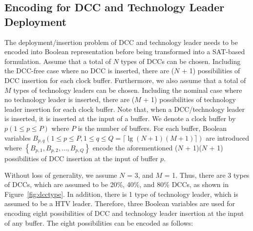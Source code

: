 \subsection{Encoding for DCC and Technology Leader Deployment}
\label{subsec:eddcd}
The deployment/insertion problem of DCC and technology leader needs to be encoded into Boolean representation before being transformed into a SAT-based formulation. Assume that a total of $N$ types of DCCs can be chosen. Including the DCC-free case where no DCC is inserted, there are ($N$ + 1) possibilities of DCC insertion for each clock buffer. Furthermore, we also assume that a total of $M$ types of technology leaders can be chosen. Including the nominal case where no technology leader is inserted, there are ($M$ + 1) possibilities of technology leader insertion for each clock buffer. Note that, when a DCC/technology leader is inserted, it is inserted at the input of a buffer. We denote a clock buffer by $p\left(1 \leq p \leq P\right)$ where $P$ is the number of buffers. For each buffer, Boolean variables $B_{p,q}\left(1 \leq p \leq P, 1 \leq q \leq Q = \lceil \lg (N + 1)(M + 1)\rceil \right)$ are introduced where $\left\{B_{p,1}, B_{p,2},\dotsc, B_{p,Q}\right\}$ encode the aforementioned ($N$ + 1)($N$ + 1) possibilities of DCC insertion at the input of buffer $p$.


Without loss of generality, we assume $N$ = 3, and $M$ = 1. Thus, there are 3 types of DCCs, which are assumed to be 20\%, 40\%, and 80\% DCCs, as shown in Figure~\ref{fig:dcctype}. In addition, there is 1 type of technology leader, which is assumed to be a HTV leader. Therefore, three Boolean variables are used for encoding eight possibilities of DCC and technology leader insertion at the input of any buffer. The eight possibilities can be encoded as follows:\newline


